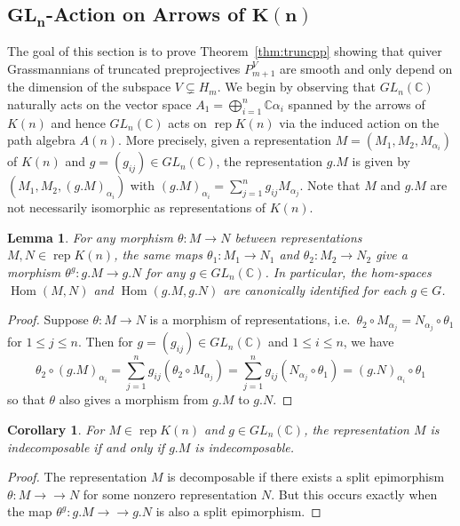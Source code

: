 \documentclass{amsart}
\newtheorem{corollary}[theorem]{Corollary}
\newtheorem{lemma}[theorem]{Lemma}
\numberwithin{equation}{section}
\newcommand{\CC}{\mathbb{C}}
\newcommand{\onto}{\to\!\!\!\!\!\to}
\newcommand{\Hom}{\operatorname{Hom}}
\newcommand{\rep}{\operatorname{rep}}
\begin{document}
\subsection{\texorpdfstring{$\mathbf{GL_n}$}{Gln}-Action on Arrows of \texorpdfstring{$\mathbf{K(n)}$}{K(n)}}
The goal of this section is to prove Theorem~\ref{thm:truncpp} showing that quiver Grassmannians of truncated preprojectives $P_{m+1}^V$ are smooth and only depend on the dimension of the subspace $V\subsetneq H_m$.
We begin by observing that $GL_n(\CC)$ naturally acts on the vector space $A_1=\bigoplus_{i=1}^n \CC\alpha_i$ spanned by the arrows of $K(n)$ and hence $GL_n(\CC)$ acts on $\rep K(n)$ via the induced action on the path algebra $A(n)$.
More precisely, given a representation $M=(M_1,M_2,M_{\alpha_i})$ of $K(n)$ and $g=(g_{ij})\in GL_n(\CC)$, the representation $g.M$ is given by $(M_1,M_2,(g.M)_{\alpha_i})$ with $(g.M)_{\alpha_i}=\sum\limits_{j=1}^n g_{ij}M_{\alpha_j}$.
Note that $M$ and $g.M$ are not necessarily isomorphic as representations of $K(n)$.
\begin{lemma}
  \label{le:hom equivariance}
  For any morphism $\theta:M\to N$ between representations $M,N\in\rep K(n)$, the same maps $\theta_1:M_1\to N_1$ and $\theta_2:M_2\to N_2$ give a morphism $\theta^g:g.M\to g.N$ for any $g\in GL_n(\CC)$.
  In particular, the hom-spaces $\Hom(M,N)$ and $\Hom(g.M,g.N)$ are canonically identified for each $g\in G$.
\end{lemma}
\begin{proof}
  Suppose $\theta:M\to N$ is a morphism of representations, i.e.\ $\theta_2\circ M_{\alpha_j}=N_{\alpha_j}\circ\theta_1$ for $1\le j\le n$.
  Then for $g=(g_{ij})\in GL_n(\CC)$ and $1\le i\le n$, we have
  \[\theta_2\circ (g.M)_{\alpha_i}=\sum\limits_{j=1}^n g_{ij}(\theta_2\circ M_{\alpha_j})=\sum\limits_{j=1}^n g_{ij}(N_{\alpha_j}\circ\theta_1)=(g.N)_{\alpha_i}\circ\theta_1\]
  so that $\theta$ also gives a morphism from $g.M$ to $g.N$. 
\end{proof}
\begin{corollary}
  \label{cor:indecomposability}
  For $M\in\rep K(n)$ and $g\in GL_n(\CC)$, the representation $M$ is indecomposable if and only if $g.M$ is indecomposable.
\end{corollary}
\begin{proof}
  The representation $M$ is decomposable if there exists a split epimorphism $\theta:M\onto N$ for some nonzero representation $N$.
  But this occurs exactly when the map $\theta^g:g.M\onto g.N$ is also a split epimorphism.
\end{proof}
\end{document}

